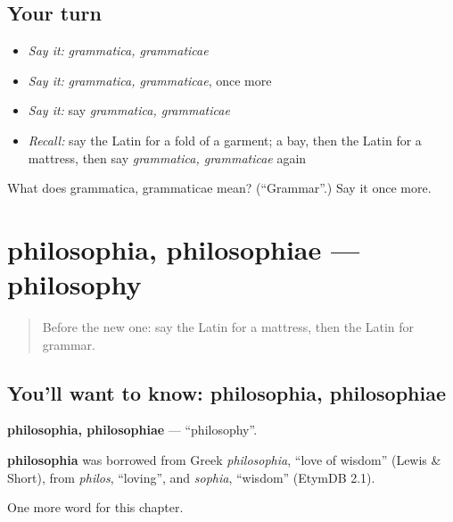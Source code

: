 \subsection*{Your turn}
\begin{itemize}
\raggedright
  \item \emph{Say it:} \emph{grammatica, grammaticae}
  \item \emph{Say it:} \emph{grammatica, grammaticae}, once more
  \item \emph{Say it:} say \emph{grammatica, grammaticae}
  \item \emph{Recall:} say the Latin for a fold of a garment; a bay, then the Latin for a mattress, then say \emph{grammatica, grammaticae} again
\end{itemize}

\begin{tcolorbox}[breakable,colback=teal!4,colframe=teal!35!black,title={Before you move on}]
What does grammatica, grammaticae mean? (\textquotedblleft{}Grammar\textquotedblright{}.) Say it once more.
\end{tcolorbox}
\section[philosophia, philosophiae]{philosophia, philosophiae — philosophy}

\label{lesson:LA-C226-philosophia}



\begin{quote}
Before the new one: say the Latin for a mattress, then the Latin for grammar.
\end{quote}

\subsection*{You'll want to know: philosophia, philosophiae}
\textbf{philosophia, philosophiae} — \textquotedblleft{}philosophy\textquotedblright{}.

\begin{cousinweb}
\textbf{philosophia} was borrowed from Greek \emph{philosophia}, \textquotedblleft{}love of wisdom\textquotedblright{} (Lewis \& Short), from \emph{philos}, \textquotedblleft{}loving\textquotedblright{}, and \emph{sophia}, \textquotedblleft{}wisdom\textquotedblright{} (EtymDB 2.1).
\end{cousinweb}

\begin{grammarlens}[title={What you've built}]
One more word for this chapter.
\end{grammarlens}

